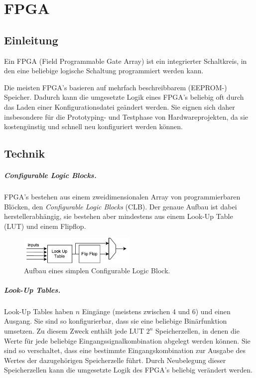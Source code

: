 \chapter{FPGA} %
\label{FPGA} %

\section{Einleitung}
Ein FPGA (Field Programmable Gate Array) ist ein integrierter Schaltkreis, in den eine beliebige logische Schaltung programmiert werden kann.

Die meisten FPGA's basieren auf mehrfach beschreibbarem (EEPROM-) Speicher. Dadurch kann die umgesetzte Logik eines FPGA's beliebig oft durch das Laden einer Konfigurationsdatei geändert werden. Sie eignen sich daher insbesondere für die Prototyping- und Testphase von Hardwareprojekten, da sie kostengünstig und schnell neu konfiguriert werden können. \cite[S. 8]{SynthesisFPGA}

\section{Technik}
\paragraph{Configurable Logic Blocks.} FPGA's bestehen aus einem zweidimensionalen Array von programmierbaren Blöcken, den \emph{Configurable Logic Blocks} (CLB). \cite[S. 11]{Chu} Der genaue Aufbau ist dabei herstellerabhängig, sie bestehen aber mindestens aus einem Look-Up Table (LUT) und einem Flipflop. \cite[S. 8]{SynthesisFPGA}

\begin{figure} [ht]
  \centering
  \includegraphics[width=0.5\textwidth]{Figures/clb}
  \caption{Aufbau eines simplen Configurable Logic Block.}
  \label{fig:clb}
\end{figure}


\paragraph{Look-Up Tables.} Look-Up Tables haben $n$ Eingänge (meistens zwischen 4 und 6) und einen Ausgang. Sie sind so konfigurierbar, dass sie eine beliebige Binärfunktion umsetzen. Zu diesem Zweck enthält jede LUT $2^n$ Speicherzellen, in denen die Werte für jede beliebige Eingangssignalkombination abgelegt werden können. Sie sind so verschaltet, dass eine bestimmte Eingangskombination zur Ausgabe des Wertes der dazugehörigen Speicherzelle führt. \cite[S. 12f.]{Chu} Durch Neubelegung dieser Speicherzellen kann die umgesetzte Logik des FPGA's beliebig verändert werden. 

